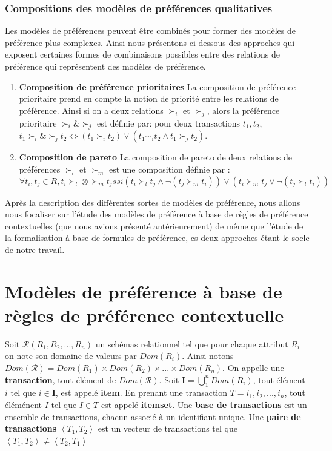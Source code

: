 \documentclass[a4paper,12pt,openany,oneside]{article}
\begin{document}
\subsubsection{Compositions des modèles de préférences qualitatives}
Les modèles de préférences peuvent être combinés pour former des modèles de préférence plus complexes. Ainsi nous présentons ci dessous des approches qui exposent certaines formes de combinaisons possibles entre des relations de préférence qui représentent des modèles de préférence.
\begin{enumerate}

\item \textbf{Composition de préférence prioritaires}
La composition de préférence prioritaire prend en compte la notion de priorité entre les relations de préférence. Ainsi si on a deux relations $\succ_i$ et $\succ_j$, alors la préférence prioritaire $\succ_i\&\succ_j$ est définie par: pour deux transactions $t_1,t_2$, $t_1\succ_i\&\succ_j t_2 \Leftrightarrow (t_1\succ_i t_2)\vee(t_1\sim_i t_2\wedge t_1\succ_j t_2)$.

\item \textbf{Composition de pareto}
La composition de pareto de deux relations de préférences $\succ_l$ et $\succ_m$ est une composition définie par :
\[
	\forall t_i,t_j\in R, t_i\succ_l\otimes\succ_m t_j ssi (t_i\succ_l t_j\wedge \neg (t_j\succ_m t_i))\vee(t_i\succ_m t_j\vee \neg(t_j\succ_l t_i))
\] 
\end{enumerate}




Après la description des différentes sortes de modèles de préférence, nous allons nous focaliser sur l'étude des modèles de préférence à base de règles de préférence contextuelles (que nous avions présenté antérieurement) de même que l'étude de la formalisation à base de formules de préférence, cs deux approches étant le socle de notre travail.


 
 \section{Modèles de préférence à base de règles de préférence contextuelle}
 	

	Soit $\mathcal{R}(R_{1},R_{2},...,R_{n})$ un schémas relationnel tel que pour chaque attribut $R_{i}$ on note son domaine de valeurs par $Dom(R_{i})$. 
	Ainsi notons $Dom(\mathcal{R})=Dom(R_{1})\times Dom(R_{2})\times ...\times Dom(R_{n})$. On appelle une \textbf{transaction}, tout élément de $Dom(\mathcal{R})$. 
	Soit $\mathbf{I}=\bigcup_{1}^{n}Dom(R_{i})$, tout élément $i$ tel que $i\in \mathbf{I}$, est appelé \textbf{item}.
	En prenant une transaction $T={i_1,i_2,...,i_n}$, tout éléménent $I$ tel que $I\in T$ est appelé \textbf{itemset}.
        Une \textbf{base de transactions} est un ensemble de transactions, chacun associé à un identifiant unique.	
	Une \textbf{paire de transactions} $\left<T_1,T_2\right>$ est un vecteur de transactions tel que $\left<T_1,T_2\right>\neq \left<T_2,T_1\right>$
 
\end{document}
